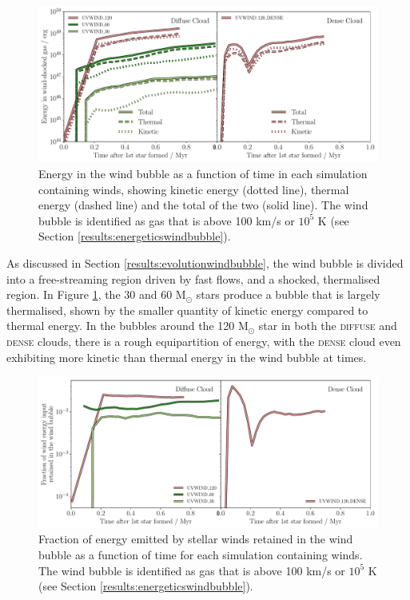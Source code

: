 \documentclass[a4paper,fleqn,usenatbib]{mnras}
\newcommand{\Msolar}{M$_{\odot}$\xspace}
\begin{document}
\begin{figure}
	\includegraphics[width=1.98\columnwidth]{../plots/windenergy_both.pdf}
	\caption{Energy in the wind bubble as a function of time in each simulation containing winds, showing kinetic energy (dotted line), thermal energy (dashed line) and the total of the two (solid line). The wind bubble is identified as gas that is above 100 km/s or $10^5$ K (see Section \protect\ref{results:energeticswindbubble}).}
	\label{fig:windenergy}
\end{figure}

As discussed in Section \ref{results:evolutionwindbubble}, the wind bubble is divided into a free-streaming region driven by fast flows, and a shocked, thermalised region. In Figure \ref{fig:windenergy}, the 30 and 60 \Msolar stars produce a bubble that is largely thermalised, shown by the smaller quantity of kinetic energy compared to thermal energy. In the bubbles around the 120 \Msolar star in both the \textsc{diffuse} and \textsc{dense} clouds, there is a rough equipartition of energy, with the \textsc{dense} cloud even exhibiting more kinetic than thermal energy in the wind bubble at times.

\begin{figure}
	\includegraphics[width=1.98\columnwidth]{../plots/windenergyretained_both.pdf}
	\caption{Fraction of energy emitted by stellar winds retained in the wind bubble as a function of time for each simulation containing winds. The wind bubble is identified as gas that is above 100 km/s or $10^5$ K (see Section \protect\ref{results:energeticswindbubble}).}
	\label{fig:windenergyretained}
\end{figure}
\end{document}
